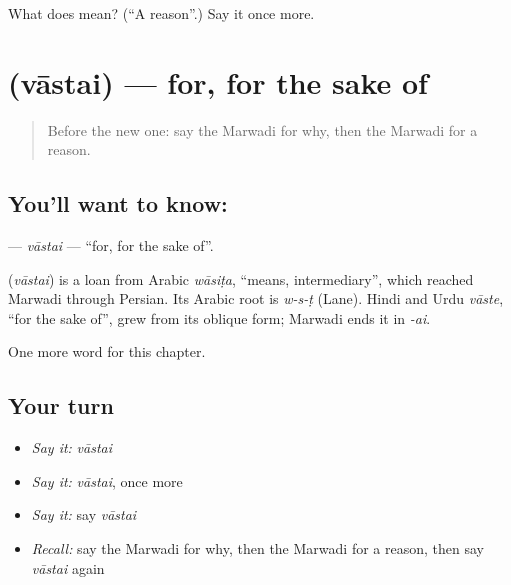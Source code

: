 \begin{tcolorbox}[breakable,colback=teal!4,colframe=teal!35!black,title={Before you move on}]
What does  mean? (\textquotedblleft{}A reason\textquotedblright{}.) Say it once more.
\end{tcolorbox}
\section[\texorpdfstring{\mw{वास्तै} (vāstai)}{वास्तै (vāstai)}]{ (vāstai) — for, for the sake of}

\label{lesson:MW-C117-vastai}



\begin{quote}
Before the new one: say the Marwadi for why, then the Marwadi for a reason.
\end{quote}

\subsection*{You'll want to know: }
\textbf{} — \emph{vāstai} — \textquotedblleft{}for, for the sake of\textquotedblright{}.

\begin{cousinweb}
\textbf{} (\emph{vāstai}) is a loan from Arabic \emph{wāsiṭa}, \textquotedblleft{}means, intermediary\textquotedblright{}, which reached Marwadi through Persian. Its Arabic root is \emph{w-s-ṭ} (Lane). Hindi and Urdu \emph{vāste}, \textquotedblleft{}for the sake of\textquotedblright{}, grew from its oblique form; Marwadi ends it in \emph{-ai}.
\end{cousinweb}

\begin{grammarlens}[title={What you've built}]
One more word for this chapter.
\end{grammarlens}

\subsection*{Your turn}
\begin{itemize}
\raggedright
  \item \emph{Say it:} \emph{vāstai}
  \item \emph{Say it:} \emph{vāstai}, once more
  \item \emph{Say it:} say \emph{vāstai}
  \item \emph{Recall:} say the Marwadi for why, then the Marwadi for a reason, then say \emph{vāstai} again
\end{itemize}

